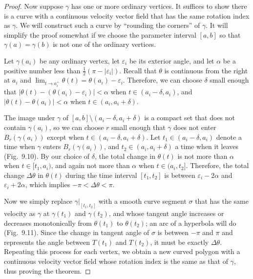 \begin{proof}
Now suppose $\gamma$ has one or more ordinary vertices. It suffices to show there is a curve with a continuous velocity vector field that has the same rotation index as $\gamma$. We will construct such a curve by ``rounding the corners'' of $\gamma$. It will simplify the proof somewhat if we choose the parameter interval $[a,b]$ so that $\gamma(a) = \gamma(b)$ is not one of the ordinary vertices.


Let $\gamma(a_i)$ be any ordinary vertex, let $\varepsilon_i$ be its exterior angle, and let $\alpha$ be a positive number less than $\frac{1}{2}(\pi - |\varepsilon_i|)$. Recall that $\theta$ is continuous from the right at $a_i$ and $\lim_{t \to a_i^+} \theta(t) = \theta(a_i) - \varepsilon_i$. Therefore, we can choose $\delta$ small enough that $|\theta(t) - (\theta(a_i) - \varepsilon_i)| < \alpha$ when $t \in (a_i - \delta, a_i)$, and $|\theta(t) - \theta(a_i)| < \alpha$ when $t \in (a_i, a_i + \delta)$.

The image under $\gamma$ of $[a,b] \setminus (a_i - \delta, a_i + \delta)$ is a compact set that does not contain $\gamma(a_i)$, so we can choose $r$ small enough that $\gamma$ does not enter $B_r(\gamma(a_i))$ except when $t \in (a_i - \delta, a_i + \delta)$. Let $t_1 \in (a_i - \delta, a_i)$ denote a time when $\gamma$ enters $B_r(\gamma(a_i))$, and $t_2 \in (a_i, a_i + \delta)$ a time when it leaves (Fig.\ 9.10). By our choice of $\delta$, the total change in $\theta(t)$ is not more than $\alpha$ when $t \in [t_1, a_i)$, and again not more than $\alpha$ when $t \in (a_i, t_2]$. Therefore, the total change $\Delta \theta$ in $\theta(t)$ during the time interval $[t_1, t_2]$ is between $\varepsilon_i - 2\alpha$ and $\varepsilon_i + 2\alpha$, which implies $-\pi < \Delta \theta < \pi$.

Now we simply replace $\gamma|_{[t_1, t_2]}$ with a smooth curve segment $\sigma$ that has the same velocity as $\gamma$ at $\gamma(t_1)$ and $\gamma(t_2)$, and whose tangent angle increases or decreases monotonically from $\theta(t_1)$ to $\theta(t_2)$; an arc of a hyperbola will do (Fig.\ 9.11). Since the change in tangent angle of $\sigma$ is between $-\pi$ and $\pi$ and represents the angle between $T(t_1)$ and $T(t_2)$, it must be exactly $\Delta\theta$. Repeating this process for each vertex, we obtain a new curved polygon with a continuous velocity vector field whose rotation index is the same as that of $\gamma$, thus proving the theorem.
\end{proof}

